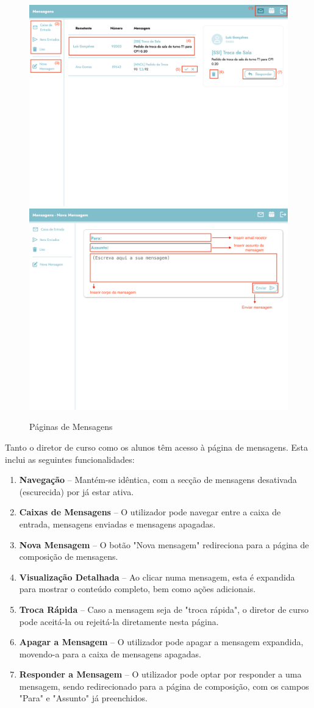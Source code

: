 \documentclass{article}
\begin{document}
\begin{figure}[H]
    \centering
    \includegraphics[width=0.49\linewidth]{manual/messages-page.png}
    \includegraphics[width=0.49\linewidth]{manual/new-message-page.png}
    \caption{Páginas de Mensagens}
    \label{fig:enter-label}
\end{figure}
Tanto o diretor de curso como os alunos têm acesso à página de mensagens. Esta inclui as seguintes funcionalidades:
\begin{enumerate}
    \item \textbf{Navegação} – Mantém-se idêntica, com a secção de mensagens desativada (escurecida) por já estar ativa.
    \item \textbf{Caixas de Mensagens} – O utilizador pode navegar entre a caixa de entrada, mensagens enviadas e mensagens apagadas.
    \item \textbf{Nova Mensagem} – O botão "Nova mensagem" redireciona para a página de composição de mensagens.
    \item \textbf{Visualização Detalhada} – Ao clicar numa mensagem, esta é expandida para mostrar o conteúdo completo, bem como ações adicionais.
    \item \textbf{Troca Rápida} – Caso a mensagem seja de "troca rápida", o diretor de curso pode aceitá-la ou rejeitá-la diretamente nesta página.
    \item \textbf{Apagar a Mensagem} – O utilizador pode apagar a mensagem expandida, movendo-a para a caixa de mensagens apagadas.
    \item \textbf{Responder a Mensagem} – O utilizador pode optar por responder a uma mensagem, sendo redirecionado para a página de composição, com os campos "Para" e "Assunto" já preenchidos.
\end{enumerate}
\end{document}
